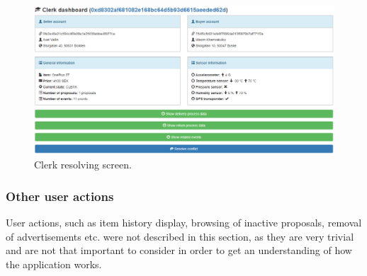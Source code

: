 \begin{figure}[H]
\centering
\includegraphics[scale=0.44]{app_screens/clerk_resolvement.png}
\caption{Clerk resolving screen.}
\label{fig:clerkresolvement}
\end{figure}

\subsubsection{Other user actions}
User actions, such as item history display, browsing of inactive proposals, removal of advertisements etc. were not described in this section, as they are very trivial and are not that important to consider in order to get an understanding of how the application works.